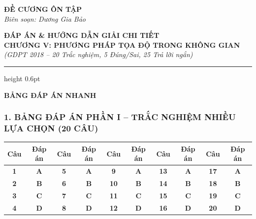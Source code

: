 \documentclass[12pt,a4paper]{article}
\begin{document}
\thispagestyle{firstpage}

\noindent
\begin{minipage}[t]{0.36\textwidth}
    \centering
    {\fontsize{12}{14}\selectfont\textbf{ĐỀ CƯƠNG ÔN TẬP}}\\[4pt]
    \textit{Biên soạn: Dương Gia Bảo}\\[6pt]
    \setlength{\fboxrule}{0.8pt}
    \setlength{\fboxsep}{5pt}
\end{minipage}\hfill
\begin{minipage}[t]{0.62\textwidth}
    \centering
    {\fontsize{13}{15}\selectfont\textbf{ĐÁP ÁN \& HƯỚNG DẪN GIẢI CHI TIẾT}}\\[3pt]
    {\fontsize{12}{14}\selectfont\textbf{CHƯƠNG V: PHƯƠNG PHÁP TỌA ĐỘ TRONG KHÔNG GIAN}}\\[3pt]
    {\fontsize{11}{13}\selectfont\textit{(GDPT 2018 -- 20 Trắc nghiệm, 5 Đúng/Sai, 25 Trả lời ngắn)}}
\end{minipage}

\par\vspace{4pt}
\hrule height 0.6pt
\vspace{8pt}

\begin{center}
    {\fontsize{13}{15}\selectfont\textbf{BẢNG ĐÁP ÁN NHANH}}
\end{center}

\subsubsection*{1. BẢNG ĐÁP ÁN PHẦN I -- TRẮC NGHIỆM NHIỀU LỰA CHỌN (20 CÂU)}

\begin{center}
\renewcommand{\arraystretch}{1.22}
\begin{tabular}{|c|c||c|c||c|c||c|c||c|c|}
\hline
\textbf{Câu} & \textbf{Đáp án} & \textbf{Câu} & \textbf{Đáp án} & \textbf{Câu} & \textbf{Đáp án} & \textbf{Câu} & \textbf{Đáp án} & \textbf{Câu} & \textbf{Đáp án} \\ \hline
\textbf{1} & \textbf{A} & \textbf{5} & \textbf{A} & \textbf{9} & \textbf{A} & \textbf{13} & \textbf{A} & \textbf{17} & \textbf{A} \\ \hline
\textbf{2} & \textbf{B} & \textbf{6} & \textbf{B} & \textbf{10} & \textbf{B} & \textbf{14} & \textbf{B} & \textbf{18} & \textbf{B} \\ \hline
\textbf{3} & \textbf{C} & \textbf{7} & \textbf{C} & \textbf{11} & \textbf{C} & \textbf{15} & \textbf{C} & \textbf{19} & \textbf{C} \\ \hline
\textbf{4} & \textbf{D} & \textbf{8} & \textbf{D} & \textbf{12} & \textbf{D} & \textbf{16} & \textbf{D} & \textbf{20} & \textbf{D} \\ \hline
\end{tabular}
\end{center}
\end{document}

